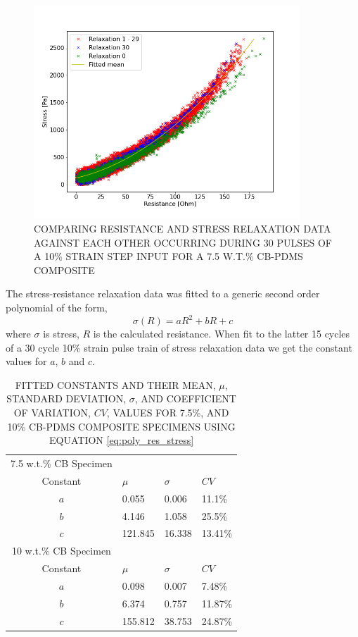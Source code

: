 \begin{figure}[H]
    \centering
    \includegraphics[width=10cm]{Figures/relax_res_stress_non_lin_rgby_MAF8_2_7-5_Epin_20mm_v3.png}
    \caption{COMPARING RESISTANCE AND STRESS RELAXATION DATA AGAINST EACH OTHER OCCURRING DURING 30 PULSES OF A 10\% STRAIN STEP INPUT FOR A 7.5 W.T.\% CB-PDMS COMPOSITE}
    \label{fig:res_vs_stress_30pulses}
\end{figure}
The stress-resistance relaxation data was fitted to a generic second order polynomial of the form, 
\begin{equation}
    \sigma(R) = aR^2+bR+c
    \label{eq:poly_res_stress}
\end{equation}
where $\sigma$ is stress, $R$ is the calculated resistance. When fit to the latter 15 cycles of a 30 cycle 10\% strain pulse train of stress relaxation data we get the constant values for $a$, $b$ and $c$.
\begin{table}[H]
\caption{FITTED CONSTANTS AND THEIR MEAN, $\mu$, STANDARD DEVIATION, $\sigma$, AND COEFFICIENT OF VARIATION, $CV$, VALUES FOR 7.5\%, AND 10\% CB-PDMS COMPOSITE SPECIMENS USING EQUATION \ref{eq:poly_res_stress}}
\begin{center}
\label{tab:generalised_model_constants}
\begin{tabular}{c l l l}
7.5 w.t.\% CB Specimen \\
Constant & $\mu$ & $\sigma$ & $CV$ \\
\hline
$a$ & 0.055 & 0.006 & 11.1\% \\
$b$ & 4.146 & 1.058 & 25.5\% \\
$c$ & 121.845 & 16.338 & 13.41\% \\
\hline
10 w.t.\% CB Specimen \\
Constant & $\mu$ & $\sigma$ & $CV$ \\
\hline
$a$ & 0.098 & 0.007 & 7.48\% \\
$b$ & 6.374 & 0.757 & 11.87\% \\
$c$ & 155.812 & 38.753 & 24.87\% \\
\hline
\end{tabular}
\end{center}
\end{table}


